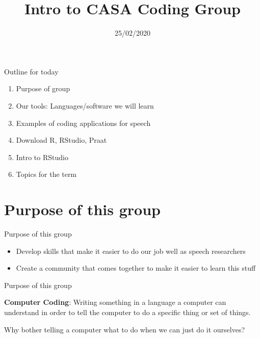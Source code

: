 \documentclass[
  ignorenonframetext,
]{beamer}
\title{Intro to CASA Coding Group}
\author{}
\date{\vspace{-2.5em}25/02/2020}
\providecommand{\tightlist}{%
  \setlength{\itemsep}{0pt}\setlength{\parskip}{0pt}}
\begin{document}
\frame{\titlepage}

\begin{frame}{Outline for today}
\protect\hypertarget{outline-for-today}{}

\begin{enumerate}
\tightlist
\item
  Purpose of group
\item
  Our tools: Languages/software we will learn
\item
  Examples of coding applications for speech
\item
  Download R, RStudio, Praat
\item
  Intro to RStudio
\item
  Topics for the term
\end{enumerate}

\end{frame}

\hypertarget{purpose-of-this-group}{%
\section{Purpose of this group}\label{purpose-of-this-group}}

\begin{frame}{Purpose of this group}
\protect\hypertarget{purpose-of-this-group-1}{}

\begin{itemize}
\tightlist
\item
  Develop skills that make it easier to do our job well as speech
  researchers
\item
  Create a community that comes together to make it easier to learn this
  stuff
\end{itemize}

\end{frame}

\begin{frame}{Purpose of this group}
\protect\hypertarget{purpose-of-this-group-2}{}

\textbf{Computer Coding}: Writing something in a language a computer can
understand in order to tell the computer to do a specific thing or set
of things.

Why bother telling a computer what to do when we can just do it
ourselves?

\end{frame}
\end{document}
